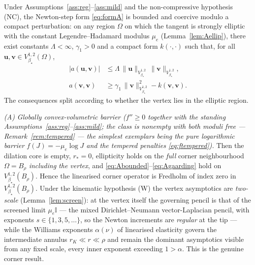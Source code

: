 \begin{theorem}
    \label{thm:A}
    Under Assumptions~\ref{ass:reg}--\ref{ass:mild} and the non-compressive hypothesis (NC), the Newton-step form
    \eqref{eq:formA} is bounded and coercive modulo a compact perturbation: on any region $\Omega$ on which the tangent
    is strongly elliptic with the constant Legendre--Hadamard modulus $\mu_e$ (Lemma~\ref{lem:Aellip}), there exist
    constants $\Lambda<\infty$, $\gamma_1>0$ and a compact form $k(\cdot,\cdot)$ such that, for all
    $\bm{u},\bm{v}\in V^{1,2}_{\beta_\star}(\Omega)$,
    \begin{align}
        \label{eq:Abounded}
        |a(\bm{u},\bm{v})| & \le \Lambda\,\|\bm{u}\|_{V^{1,2}_{\beta_\star}}\,\|\bm{v}\|_{V^{1,2}_{\beta_\star}}, \\
        \label{eq:Agaarding}
        a(\bm{v},\bm{v})   & \ge \gamma_1\,\|\bm{v}\|_{V^{1,2}_{\beta_\star}}^2 - k(\bm{v},\bm{v}).
    \end{align}
    The consequences split according to whether the vertex lies in the elliptic region.

    \emph{(A) Globally convex-volumetric barrier ($f''\ge0$ together with the standing
    Assumptions~\ref{ass:reg}--\ref{ass:mild}; the class is nonempty with both moduli free ---
    Remark~\ref{rem:tempered} --- the simplest exemplars being the pure logarithmic barrier $f(J)=-\mu_e\log J$ and
    the tempered penalties \eqref{eq:ftempered}).} Then the dilation core is empty,
    $r_*=0$, ellipticity holds on the \emph{full} corner neighbourhood $\Omega=B_\rho$ \emph{including the vertex}, and
    \eqref{eq:Abounded}--\eqref{eq:Agaarding} hold on $V^{1,2}_{\beta_\star}(B_\rho)$. Hence the linearised corner
    operator is Fredholm of index zero in $V^{1,2}_{\beta_\star}(B_\rho)$. Under the kinematic hypothesis (W) the
    vertex asymptotics are \emph{two-scale} (Lemma~\ref{lem:screen}): at the vertex itself the governing pencil is that
    of the screened limit $\mu_e\mathbb{I}$ --- the mixed Dirichlet--Neumann vector-Laplacian pencil, with exponents
    $s\in\{1,3,5,\dots\}$, so the Newton increments are \emph{regular} at the tip --- while the Williams exponents
    $\alpha(\nu)$ of linearised elasticity govern the intermediate annulus $r_K\ll r\ll\rho$ and remain the dominant
    asymptotics visible from any fixed scale, every inner exponent exceeding $1>\alpha$. This is the genuine corner
    result.


\end{theorem}
